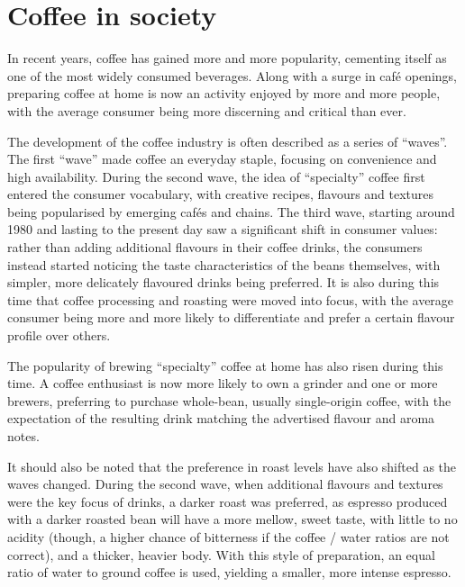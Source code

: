 \section{Coffee in society}
\label{sec:coffee-in-society}
In recent years, coffee has gained more and more popularity, cementing itself as one of the most widely consumed beverages.
Along with a surge in café openings, preparing coffee at home is now an activity enjoyed by more and more people, with the average consumer being more discerning and critical than ever.

The development of the coffee industry is often described as a series of ``waves''.
The first ``wave'' made coffee an everyday staple, focusing on convenience and high availability.
During the second wave, the idea of ``specialty'' coffee first entered the consumer vocabulary, with creative recipes, flavours and textures being popularised by emerging cafés and chains.
The third wave, starting around 1980 and lasting to the present day saw a significant shift in consumer values:
rather than adding additional flavours in their coffee drinks, the consumers instead started noticing the taste characteristics of the beans themselves,
with simpler, more delicately flavoured drinks being preferred.
It is also during this time that coffee processing and roasting were moved into focus,
with the average consumer being more and more likely to differentiate and prefer a certain flavour profile over others.

The popularity of brewing ``specialty'' coffee at home has also risen during this time.
A coffee enthusiast is now more likely to own a grinder and one or more brewers, preferring to purchase whole-bean,
usually single-origin coffee, with the expectation of the resulting drink matching the advertised flavour and aroma notes.

It should also be noted that the preference in roast levels have also shifted as the waves changed.
During the second wave, when additional flavours and textures were the key focus of drinks,
a darker roast was preferred, as espresso produced with a darker roasted bean will have a more mellow,
sweet taste, with little to no acidity (though, a higher chance of bitterness if the coffee / water ratios are not correct),
and a thicker, heavier body.
With this style of preparation, an equal ratio of water to ground coffee is used, yielding a smaller, more intense espresso.

